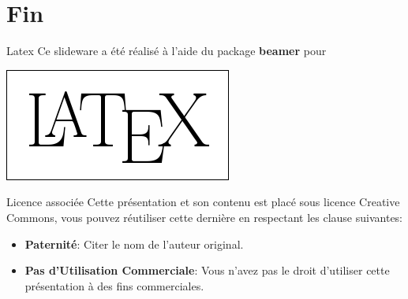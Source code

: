 \documentclass[handout]{beamer}
\begin{document}
\section{Fin}
\begin{frame}
	\begin{block}{Latex}
		Ce slideware a été réalisé à l'aide du package \textbf{beamer} pour 
		\begin{center}
			\includegraphics[scale=0.3]{../img/latex.png}
		\end{center}
	\end{block}

	\begin{block}{Licence associée}
		Cette présentation et son contenu est placé sous licence Creative Commons, vous pouvez réutiliser cette dernière en respectant les clause suivantes:
		\begin{itemize}
			\item \textbf{Paternité}: Citer le nom de l'auteur original.
			\item \textbf{Pas d'Utilisation Commerciale}: Vous n'avez pas le droit d'utiliser cette présentation à des fins commerciales.
		\end{itemize}
	\end{block}
\end{frame}

% 		
\end{document}
